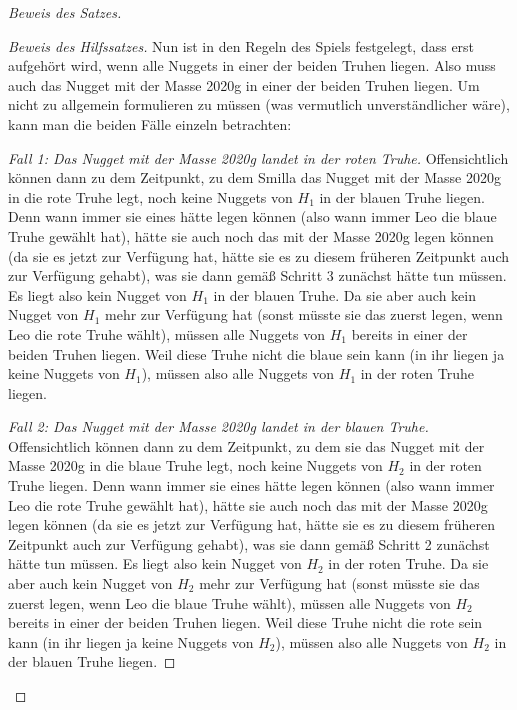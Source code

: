 \begin{proof}[Beweis des Satzes]
\begin{proof}[Beweis des Hilfssatzes]
        Nun ist in den Regeln des Spiels festgelegt, dass erst aufgehört wird, wenn alle Nuggets in einer der beiden 
        Truhen liegen. Also muss auch das Nugget mit der Masse 2020g in einer der beiden Truhen liegen. Um nicht zu 
        allgemein formulieren zu müssen (was vermutlich unverständlicher wäre), kann man die beiden Fälle einzeln 
        betrachten:

        \textit{Fall 1: Das Nugget mit der Masse 2020g landet in der roten Truhe.} Offensichtlich können dann zu dem 
        Zeitpunkt, zu dem Smilla das Nugget mit der Masse 2020g in die rote Truhe legt, noch keine Nuggets von $H_1$ in 
        der blauen Truhe liegen. Denn wann immer sie eines hätte legen können (also wann immer Leo die blaue Truhe 
        gewählt hat), hätte sie auch noch das mit der Masse 2020g legen können (da sie es jetzt zur Verfügung hat, 
        hätte sie es zu diesem früheren Zeitpunkt auch zur Verfügung gehabt), was sie dann gemäß Schritt 3 zunächst 
        hätte tun müssen. Es liegt also kein Nugget von $H_1$ in der blauen Truhe. Da sie aber auch kein Nugget von 
        $H_1$ mehr zur Verfügung hat (sonst müsste sie das zuerst legen, wenn Leo die rote Truhe wählt), müssen alle 
        Nuggets von $H_1$ bereits in einer der beiden Truhen liegen. Weil diese Truhe nicht die blaue sein kann (in 
        ihr liegen ja keine Nuggets von $H_1$), müssen also alle Nuggets von $H_1$ in der roten Truhe liegen.

        \textit{Fall 2: Das Nugget mit der Masse 2020g landet in der blauen Truhe.} Offensichtlich können dann zu dem 
        Zeitpunkt, zu dem sie das Nugget mit der Masse 2020g in die blaue Truhe legt, noch keine Nuggets von $H_2$ in 
        der roten Truhe liegen. Denn wann immer sie eines hätte legen können (also wann immer Leo die rote Truhe 
        gewählt hat), hätte sie auch noch das mit der Masse 2020g legen können (da sie es jetzt zur Verfügung hat, 
        hätte sie es zu diesem früheren Zeitpunkt auch zur Verfügung gehabt), was sie dann gemäß Schritt 2 zunächst 
        hätte tun müssen. Es liegt also kein Nugget von $H_2$ in der roten Truhe. Da sie aber auch kein Nugget von 
        $H_2$ mehr zur Verfügung hat (sonst müsste sie das zuerst legen, wenn Leo die blaue Truhe wählt), müssen alle 
        Nuggets von $H_2$ bereits in einer der beiden Truhen liegen. Weil diese Truhe nicht die rote sein kann (in 
        ihr liegen ja keine Nuggets von $H_2$), müssen also alle Nuggets von $H_2$ in der blauen Truhe liegen.


\end{proof}
\end{proof}
